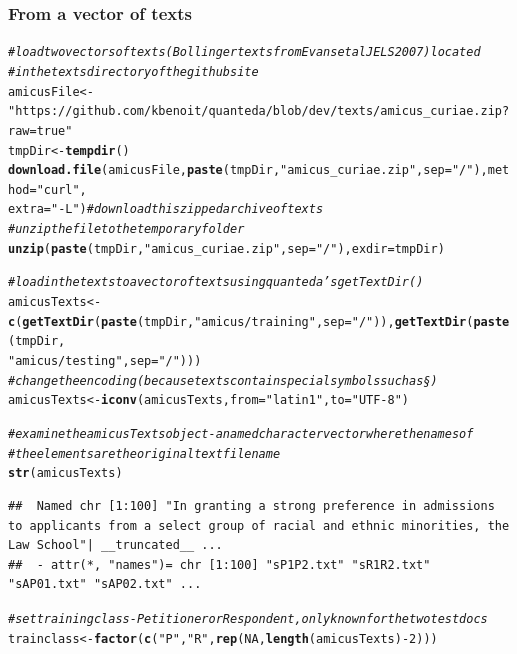 \documentclass[11pt]{article}\usepackage[]{graphicx}\usepackage[]{color}
\makeatletter
\newcommand{\hlnum}[1]{\textcolor[rgb]{0.686,0.059,0.569}{#1}}%
\newcommand{\hlstr}[1]{\textcolor[rgb]{0.192,0.494,0.8}{#1}}%
\newcommand{\hlcom}[1]{\textcolor[rgb]{0.678,0.584,0.686}{\textit{#1}}}%
\newcommand{\hlopt}[1]{\textcolor[rgb]{0,0,0}{#1}}%
\newcommand{\hlstd}[1]{\textcolor[rgb]{0.345,0.345,0.345}{#1}}%
\newcommand{\hlkwb}[1]{\textcolor[rgb]{0.69,0.353,0.396}{#1}}%
\newcommand{\hlkwc}[1]{\textcolor[rgb]{0.333,0.667,0.333}{#1}}%
\newcommand{\hlkwd}[1]{\textcolor[rgb]{0.737,0.353,0.396}{\textbf{#1}}}%
\newenvironment{kframe}{%
 \def\at@end@of@kframe{}%
 \ifinner\ifhmode%
  \def\at@end@of@kframe{\end{minipage}}%
  \begin{minipage}{\columnwidth}%
 \fi\fi%
 \def\FrameCommand##1{\hskip\@totalleftmargin \hskip-\fboxsep
 \colorbox{shadecolor}{##1}\hskip-\fboxsep
     \hskip-\linewidth \hskip-\@totalleftmargin \hskip\columnwidth}%
 \MakeFramed {\advance\hsize-\width
   \@totalleftmargin\z@ \linewidth\hsize
   \@setminipage}}%
 {\par\unskip\endMakeFramed%
 \at@end@of@kframe}
\newenvironment{knitrout}{}{} %
\makeatother
\begin{document}
\subsubsection{From a vector of texts}

\begin{knitrout}\footnotesize
{}\color{fgcolor}\begin{kframe}
\begin{alltt}
\hlcom{# load two vectors of texts (Bollinger texts from Evans et al JELS 2007) located}
\hlcom{# in the texts directory of the github site}
\hlstd{amicusFile} \hlkwb{<-} \hlstr{"https://github.com/kbenoit/quanteda/blob/dev/texts/amicus_curiae.zip?raw=true"}
\hlstd{tmpDir} \hlkwb{<-} \hlkwd{tempdir}\hlstd{()}
\hlkwd{download.file}\hlstd{(amicusFile,} \hlkwd{paste}\hlstd{(tmpDir,} \hlstr{"amicus_curiae.zip"}\hlstd{,} \hlkwc{sep} \hlstd{=} \hlstr{"/"}\hlstd{),} \hlkwc{method} \hlstd{=} \hlstr{"curl"}\hlstd{,}
    \hlkwc{extra} \hlstd{=} \hlstr{"-L"}\hlstd{)}  \hlcom{# download this zipped archive of texts}
\hlcom{# unzip the file to the temporary folder}
\hlkwd{unzip}\hlstd{(}\hlkwd{paste}\hlstd{(tmpDir,} \hlstr{"amicus_curiae.zip"}\hlstd{,} \hlkwc{sep} \hlstd{=} \hlstr{"/"}\hlstd{),} \hlkwc{exdir} \hlstd{= tmpDir)}

\hlcom{# load in the texts to a vector of texts using quanteda's getTextDir()}
\hlstd{amicusTexts} \hlkwb{<-} \hlkwd{c}\hlstd{(}\hlkwd{getTextDir}\hlstd{(}\hlkwd{paste}\hlstd{(tmpDir,} \hlstr{"amicus/training"}\hlstd{,} \hlkwc{sep} \hlstd{=} \hlstr{"/"}\hlstd{)),} \hlkwd{getTextDir}\hlstd{(}\hlkwd{paste}\hlstd{(tmpDir,}
    \hlstr{"amicus/testing"}\hlstd{,} \hlkwc{sep} \hlstd{=} \hlstr{"/"}\hlstd{)))}
\hlcom{# change the encoding (because texts contain special symbols such as §)}
\hlstd{amicusTexts} \hlkwb{<-} \hlkwd{iconv}\hlstd{(amicusTexts,} \hlkwc{from} \hlstd{=} \hlstr{"latin1"}\hlstd{,} \hlkwc{to} \hlstd{=} \hlstr{"UTF-8"}\hlstd{)}

\hlcom{# examine the amicusTexts object - a named character vector where the names of}
\hlcom{# the elements are the original text filename}
\hlkwd{str}\hlstd{(amicusTexts)}
\end{alltt}
\begin{verbatim}
##  Named chr [1:100] "In granting a strong preference in admissions to applicants from a select group of racial and ethnic minorities, the Law School"| __truncated__ ...
##  - attr(*, "names")= chr [1:100] "sP1P2.txt" "sR1R2.txt" "sAP01.txt" "sAP02.txt" ...
\end{verbatim}
\begin{alltt}
\hlcom{# set training class - Petitioner or Respondent, only known for the two test docs}
\hlstd{trainclass} \hlkwb{<-} \hlkwd{factor}\hlstd{(}\hlkwd{c}\hlstd{(}\hlstr{"P"}\hlstd{,} \hlstr{"R"}\hlstd{,} \hlkwd{rep}\hlstd{(}\hlnum{NA}\hlstd{,} \hlkwd{length}\hlstd{(amicusTexts)} \hlopt{-} \hlnum{2}\hlstd{)))}


\end{alltt}
\end{kframe}
\end{knitrout}
\end{document}
